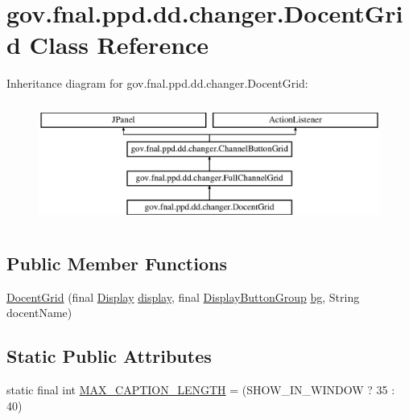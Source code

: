 \hypertarget{classgov_1_1fnal_1_1ppd_1_1dd_1_1changer_1_1DocentGrid}{\section{gov.\-fnal.\-ppd.\-dd.\-changer.\-Docent\-Grid Class Reference}
\label{classgov_1_1fnal_1_1ppd_1_1dd_1_1changer_1_1DocentGrid}
}
Inheritance diagram for gov.\-fnal.\-ppd.\-dd.\-changer.\-Docent\-Grid\-:\begin{figure}[H]
\begin{center}
\leavevmode
\includegraphics[height=4.000000cm]{classgov_1_1fnal_1_1ppd_1_1dd_1_1changer_1_1DocentGrid}
\end{center}
\end{figure}
\subsection*{Public Member Functions}
\begin{DoxyCompactItemize}
\item 
\hyperlink{classgov_1_1fnal_1_1ppd_1_1dd_1_1changer_1_1DocentGrid_a8d11fc4a2cae91c4b626b99ad1c8051a}{Docent\-Grid} (final \hyperlink{interfacegov_1_1fnal_1_1ppd_1_1dd_1_1signage_1_1Display}{Display} \hyperlink{classgov_1_1fnal_1_1ppd_1_1dd_1_1changer_1_1ChannelButtonGrid_a3c06b51489dcaacd16f6efcefe06bcaa}{display}, final \hyperlink{classgov_1_1fnal_1_1ppd_1_1dd_1_1util_1_1specific_1_1DisplayButtonGroup}{Display\-Button\-Group} \hyperlink{classgov_1_1fnal_1_1ppd_1_1dd_1_1changer_1_1ChannelButtonGrid_adf258a89161282e5215b4642ecbec812}{bg}, String docent\-Name)
\end{DoxyCompactItemize}
\subsection*{Static Public Attributes}
\begin{DoxyCompactItemize}
\item 
static final int \hyperlink{classgov_1_1fnal_1_1ppd_1_1dd_1_1changer_1_1DocentGrid_aebf6698c77d6b3a216c185900f253373}{M\-A\-X\-\_\-\-C\-A\-P\-T\-I\-O\-N\-\_\-\-L\-E\-N\-G\-T\-H} = (S\-H\-O\-W\-\_\-\-I\-N\-\_\-\-W\-I\-N\-D\-O\-W ? 35 \-: 40)
\end{DoxyCompactItemize}
